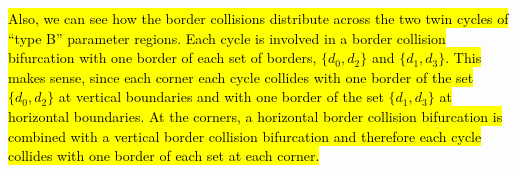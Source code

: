 \hl{
	Also, we can see how the border collisions distribute across the two twin cycles of ``type B'' parameter regions.
	Each cycle is involved in a border collision bifurcation with one border of each set of borders, $\{d_0, d_2\}$ and $\{d_1, d_3\}$.
	This makes sense, since each corner each cycle collides with one border of the set $\{d_0, d_2\}$ at vertical boundaries and with one border of the set $\{d_1, d_3\}$ at horizontal boundaries.
	At the corners, a horizontal border collision bifurcation is combined with a vertical border collision bifurcation and therefore each cycle collides with one border of each set at each corner.
}
